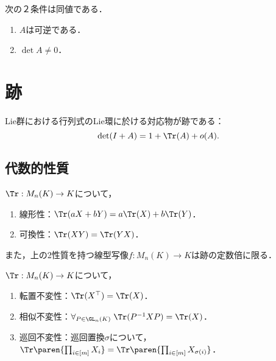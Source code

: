 \documentclass[uplatex, dvipdfmx]{jsreport}
\begin{document}
\begin{corollary}\label{cor-characterization-of-invertibility}
    次の２条件は同値である．
    \begin{enumerate}
        \item $A$は可逆である．
        \item $\det A\ne 0$．
    \end{enumerate}
\end{corollary}

\section{跡}

\begin{tcolorbox}[colframe=ForestGreen, colback=ForestGreen!10!white,breakable,colbacktitle=ForestGreen!40!white,coltitle=black,fonttitle=\bfseries\sffamily,
title=]
    Lie群における行列式のLie環に於ける対応物が跡である：
    \[\det(I+A)=1+\Tr(A)+o(A).\]
\end{tcolorbox}

\subsection{代数的性質}

\begin{proposition}[代数的性質による特徴付け]
    $\Tr:M_n(K)\to K$について，
    \begin{enumerate}
        \item 線形性：$\Tr(aX+bY)=a\Tr(X)+b\Tr(Y)$．
        \item 可換性：$\Tr(XY)=\Tr(YX)$．
    \end{enumerate}
    また，上の2性質を持つ線型写像$f:M_n(K)\to K$は跡の定数倍に限る．
\end{proposition}

\begin{proposition}[3つの不変性]
    $\Tr:M_n(K)\to K$について，
    \begin{enumerate}
        \item 転置不変性：$\Tr(X^\top)=\Tr(X)$．
        \item 相似不変性：$\forall_{P\in\GL_n(K)}\;\Tr(P^{-1}XP)=\Tr(X)$．
        \item 巡回不変性：巡回置換$\sigma$について，$\Tr\paren{\prod_{i\in[m]}X_i}=\Tr\paren{\prod_{i\in[m]}X_{\sigma(i)}}$．
    \end{enumerate}
\end{proposition}
\end{document}
